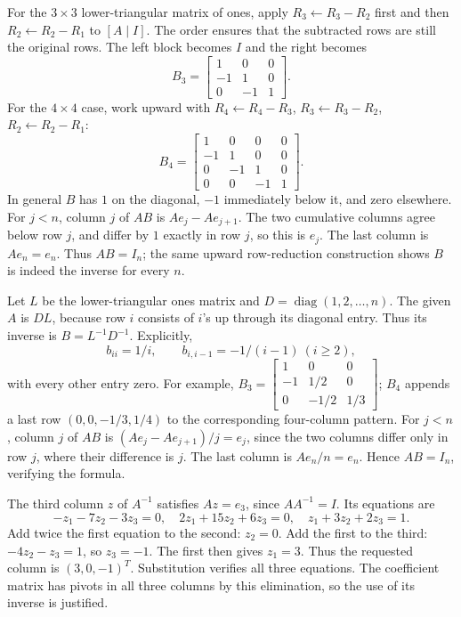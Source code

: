 For the $3\times3$ lower-triangular matrix of ones, apply
$R_3\gets R_3-R_2$ first and then $R_2\gets R_2-R_1$ to $[A\mid I]$.
The order ensures that the subtracted rows are still the original rows.
The left block becomes $I$ and the right becomes
\[
 B_3=\begin{bmatrix}1&0&0\\-1&1&0\\0&-1&1\end{bmatrix}.
\]
For the $4\times4$ case, work upward with
$R_4\gets R_4-R_3$, $R_3\gets R_3-R_2$, $R_2\gets R_2-R_1$:
\[
 B_4=\begin{bmatrix}1&0&0&0\\-1&1&0&0\\0&-1&1&0\\0&0&-1&1\end{bmatrix}.
\]
In general $B$ has $1$ on the diagonal, $-1$ immediately below it, and
zero elsewhere. For $j<n$, column $j$ of $AB$ is
$Ae_j-Ae_{j+1}$. The two cumulative columns agree below row $j$, and
differ by $1$ exactly in row $j$, so this is $e_j$. The last column is
$Ae_n=e_n$. Thus $AB=I_n$; the same upward row-reduction construction
shows $B$ is indeed the inverse for every $n$.

Let $L$ be the lower-triangular ones matrix and
$D=\operatorname{diag}(1,2,\ldots,n)$. The given $A$ is $DL$,
because row $i$ consists of $i$'s up through its diagonal entry.
Thus its inverse is $B=L^{-1}D^{-1}$. Explicitly,
\[
 b_{ii}=1/i,\qquad b_{i,i-1}=-1/(i-1)\ (i\ge2),
\]
with every other entry zero. For example,
$B_3=\begin{bmatrix}1&0&0\\-1&1/2&0\\0&-1/2&1/3\end{bmatrix}$;
$B_4$ appends a last row $(0,0,-1/3,1/4)$ to the corresponding four-column
pattern. For $j<n$, column $j$ of $AB$ is $(Ae_j-Ae_{j+1})/j=e_j$,
since the two columns differ only in row $j$, where their difference is $j$.
The last column is $Ae_n/n=e_n$. Hence $AB=I_n$, verifying the formula.

The third column $z$ of $A^{-1}$ satisfies $Az=e_3$, since
$AA^{-1}=I$. Its equations are
\[
 -z_1-7z_2-3z_3=0,\quad
 2z_1+15z_2+6z_3=0,\quad z_1+3z_2+2z_3=1.
\]
Add twice the first equation to the second: $z_2=0$.
Add the first to the third: $-4z_2-z_3=1$, so $z_3=-1$.
The first then gives $z_1=3$. Thus the requested column is
$\boxed{(3,0,-1)^T}$. Substitution verifies all three equations.
The coefficient matrix has pivots in all three columns by this elimination,
so the use of its inverse is justified.

